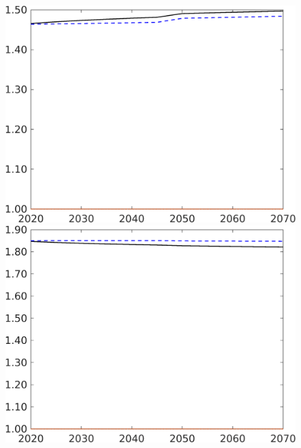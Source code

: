 \begin{figure}[h!!]
\begin{minipage}[]{0.32\textwidth}
	\end{minipage}
	\begin{minipage}[]{0.32\textwidth}
		\includegraphics[width=1\textwidth]{../../codding_model/own_basedOnFried/optimalPol_190722_tidiedUp/figures/all_10Aout22/CompMod1_OPT_T_NoTaus_hhhl_regime3_spillover0_noskill0_sep1_xgrowth0_extern0_etaa0.79_lgd0.png}
	\end{minipage}
	\begin{minipage}[]{0.32\textwidth}
		\includegraphics[width=1\textwidth]{../../codding_model/own_basedOnFried/optimalPol_190722_tidiedUp/figures/all_10Aout22/CompMod1_OPT_T_NoTaus_whwl_regime3_spillover0_noskill0_sep1_xgrowth0_extern0_etaa0.79_lgd0.png}

\end{minipage}
\end{figure}
